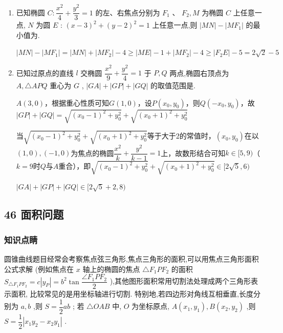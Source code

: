 \begin{enumerate}
    \item 已知椭圆 $C : \dfrac{{x}^{2}}{4} + \dfrac{{y}^{2}}{3} = 1$ 的左、右焦点分别为 ${F}_{1}\text{ 、 }{F}_{2},M$ 为椭圆 $C$ 上任意一点, $N$ 为圆 $E$ : ${\left( x - 3\right) }^{2} + {\left( y - 2\right) }^{2} = 1$ 上任意一点,则 $\left| {MN}\right|  - \left| {M{F}_{1}}\right|$ 的最小值为.
    \begin{jieda}
        $\left| {MN}\right|  - \left| {M{F}_{1}}\right| = |MN| + |MF_2| - 4 \geq |ME| - 1 + |MF_2| - 4 \geq |F_2E| - 5 = 2\sqrt{2}-5$
    \end{jieda}
    \item 已知过原点的直线 $l$ 交椭圆 $\dfrac{{x}^{2}}{9} + \dfrac{{y}^{2}}{4} = 1$ 于 $P,Q$ 两点,椭圆右顶点为 $A,\bigtriangleup {APQ}$ 重心为 $G$ , $\left| {GA}\right|  + \left| {GP}\right|  + \left| {GQ}\right|$ 的取值范围是\blkda[3]{$[2\sqrt{5}+2, 8)$}.
    \begin{jieda}
        $A(3, 0)$，根据重心性质可知$G(1, 0)$，设$P(x_0, y_0)$，则$Q(-x_0, y_0)$，故$|GP|+|GQ| = \sqrt{(x_0-1)^2+y_0^2}+\sqrt{(x_0+1)^2+y_0^2}$

        当$\sqrt{(x_0-1)^2+y_0^2}+\sqrt{(x_0+1)^2+y_0^2}$等于大于2的常值时，$(x_0, y_0)$在以$(1, 0), (-1, 0)$为焦点的椭圆$\dfrac{x^2}{k}+\dfrac{y^2}{k-1} = 1$上，故数形结合可知$k \in [5, 9)$（$k = 9$时$Q$与$A$重合），即$\sqrt{(x_0-1)^2+y_0^2}+\sqrt{(x_0+1)^2+y_0^2} \in [2\sqrt{5}, 6)$

        $\left| {GA}\right|  + \left| {GP}\right|  + \left| {GQ}\right| \in [2\sqrt{5}+2, 8)$
    \end{jieda}
\end{enumerate}

\subsection*{46 面积问题}

\subsubsection*{知识点睛}

圆锥曲线题目经常会考察焦点弦三角形,焦点三角形的面积,可以用焦点三角形面积公式求解 (例如焦点在 $x$ 轴上的椭圆的焦点 $\bigtriangleup {F}_{1}P{F}_{2}$ 的面积 ${S}_{\bigtriangleup {F}_{1}P{F}_{2}} = c\left| {y}_{P}\right|  = {b}^{2}\tan \dfrac{\angle {F}_{1}P{F}_{2}}{2}$ ),其他图形面积常用切割法处理成两个三角形表示面积, 比较常见的是用坐标轴进行切割. 特别地,若四边形对角线互相垂直,长度分别为 $a,b$ ,则 $S = \dfrac{1}{2}{ab}$ ; 若 $\bigtriangleup {OAB}$ 中, $O$ 为坐标原点, $A\left( {{x}_{1},{y}_{1}}\right) ,B\left( {{x}_{2},{y}_{2}}\right)$ ,则 $S = \dfrac{1}{2}\left| {{x}_{1}{y}_{2} - {x}_{2}{y}_{1}}\right|$ .

